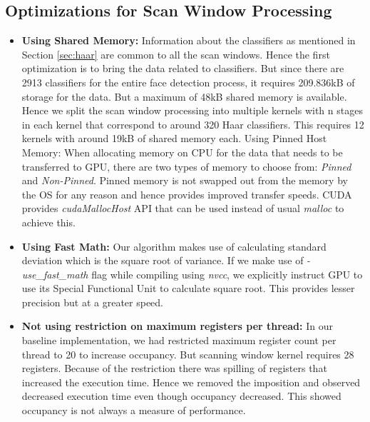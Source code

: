 \subsection{Optimizations for Scan Window Processing}\label{sec:haar_optim}
\begin{itemize}

\item \textbf{Using Shared Memory:}
Information about the classifiers as mentioned in Section
\ref{sec:haar} are common to all the scan windows. Hence the first optimization 
is to bring the data related to classifiers. But since there are 2913 classifiers 
for the entire face detection process, it requires 209.836kB of storage for the data. 
But a maximum of 48kB shared memory is available. Hence we split the scan window processing 
into multiple kernels with n stages in each kernel that correspond to around 320 Haar classifiers. 
This requires 12 kernels with around 19kB of shared memory each.
Using Pinned Host Memory: When allocating memory on CPU for the data that needs to be transferred 
to GPU, there are two types of memory to choose from: \emph{Pinned} and \emph{Non-Pinned}. 
Pinned memory is not swapped out from the memory by the OS for any reason and hence provides 
improved transfer speeds. CUDA provides \emph{cudaMallocHost} API that can be used instead of 
usual \emph{malloc} to achieve this.

\vspace{0.1in}
\item \textbf{Using Fast Math:}
Our algorithm makes use of calculating standard deviation which is the square 
root of variance. If we make use of \emph{-use\_fast\_math} flag while compiling using \emph{nvcc}, 
we explicitly instruct GPU to use its Special Functional Unit to calculate square root. This provides 
lesser precision but at a greater speed. 

\vspace{0.1in}
\item \textbf{Not using restriction on maximum registers per thread:}
In our baseline implementation, we had 
restricted maximum register count per thread to 20 to increase occupancy. But scanning window 
kernel requires 28 registers. Because of the restriction there was spilling of registers that 
increased the execution time. Hence we removed the imposition and observed decreased execution 
time even though occupancy decreased. This showed occupancy is not always a measure of performance.


\end{itemize}
